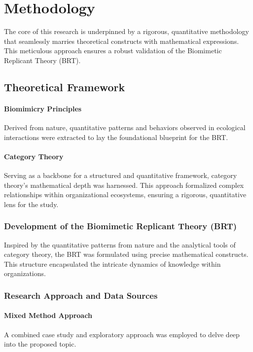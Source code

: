 \documentclass[sn-nature]{sn-jnl}%
\theoremstyle{thmstyleone}%
\theoremstyle{thmstyletwo}%
\theoremstyle{thmstylethree}%
\begin{document}
\section{Methodology}\label{sec3}

The core of this research is underpinned by a rigorous, quantitative methodology that seamlessly marries theoretical constructs with mathematical expressions. This meticulous approach ensures a robust validation of the Biomimetic Replicant Theory (BRT).

\subsection{Theoretical Framework}

\paragraph{Biomimicry Principles} Derived from nature, quantitative patterns and behaviors observed in ecological interactions were extracted to lay the foundational blueprint for the BRT.

\paragraph{Category Theory} Serving as a backbone for a structured and quantitative framework, category theory's mathematical depth was harnessed. This approach formalized complex relationships within organizational ecosystems, ensuring a rigorous, quantitative lens for the study.

\subsubsection{Development of the Biomimetic Replicant Theory (BRT)}

Inspired by the quantitative patterns from nature and the analytical tools of category theory, the BRT was formulated using precise mathematical constructs. This structure encapsulated the intricate dynamics of knowledge within organizations.
\subsubsection{Research Approach and Data Sources}

\paragraph{Mixed Method Approach} A combined case study and exploratory approach was employed to delve deep into the proposed topic.
\end{document}
